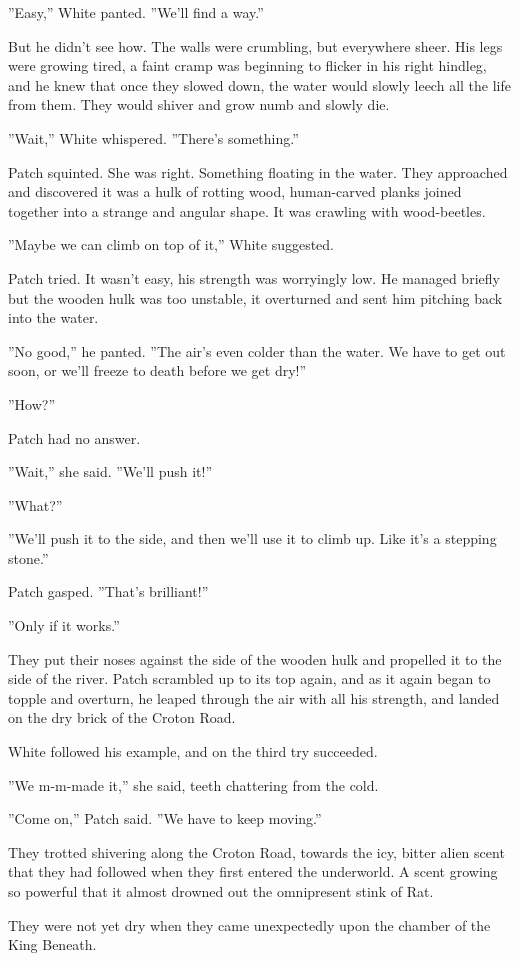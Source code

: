 \documentclass[12pt]{book}
\begin{document}
 ''Easy,'' White panted. ''We'll find a way.''\par
 But he didn't see how. The walls were crumbling, but everywhere sheer. His legs were growing tired, a faint cramp was beginning to flicker in his right hindleg, and he knew that once they slowed down, the water would slowly leech all the life from them. They would shiver and grow numb and slowly die.\par
 ''Wait,'' White whispered. ''There's something.''\par
 Patch squinted. She was right. Something floating in the water. They approached and discovered it was a hulk of rotting wood, human-carved planks joined together into a strange and angular shape. It was crawling with wood-beetles.\par
 ''Maybe we can climb on top of it,'' White suggested.\par
 Patch tried. It wasn't easy, his strength was worryingly low. He managed briefly %
 but the wooden hulk was too unstable, it overturned and sent him pitching back into the water.\par
 ''No good,'' he panted. ''The air's even colder than the water. We have to get out soon, or we'll freeze to death before we get dry!''\par
 ''How?''\par
 Patch had no answer.\par
 ''Wait,'' she said. ''We'll push it!''\par
 ''What?''\par
 ''We'll push it to the side, and then we'll use it to climb up. Like it's a stepping stone.''\par
 Patch gasped. ''That's brilliant!''\par
 ''Only if it works.''\par
 They put their noses against the side of the wooden hulk and propelled it to the side of the river. Patch scrambled up to its top again, and as it again began to topple and overturn, he leaped through the air with all his strength, and landed on the dry brick of the Croton Road.\par
White followed his example, and on the third try succeeded.\par
 ''We m-m-made it,'' she said, teeth chattering from the cold.\par
 ''Come on,'' Patch said. ''We have to keep moving.''\par
 They trotted shivering along the Croton Road, towards the icy, bitter alien scent that they had followed when they first entered the underworld. A scent growing so powerful that it almost drowned out the omnipresent stink of Rat.\par
 They were not yet dry when they came unexpectedly upon the chamber of the King Beneath.\par
\par
\end{document}
